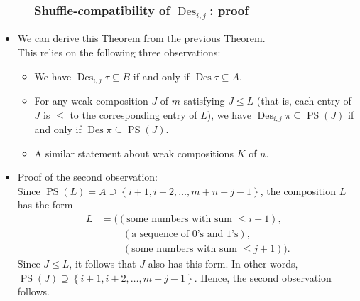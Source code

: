 \documentclass{beamer}
\newcommand{\Des}{\operatorname{Des}}
\newcommand{\PS}{\operatorname{PS}}
\newcommand{\fti}[1]{\frametitle{\ \ \ \ \ #1}}
\newcommand{\set}[1]{\left\{ #1 \right\}}
\newcommand{\tup}[1]{\left( #1 \right)}
\theoremstyle{plain}
\begin{document}
\begin{frame}
\fti{Shuffle-compatibility of $\Des_{i,j}$: proof}

\begin{itemize}

\item We can derive this Theorem from the previous Theorem. \\
      This relies on the following three observations:
      \begin{itemize}
      \item We have $\Des_{i, j} \tau \subseteq B$ if and only if
            $\Des \tau \subseteq A$.
      \item For any weak composition $J$ of $m$ satisfying
            $J \leq L$ (that is, each entry of $J$ is $\leq$
            to the corresponding entry of $L$),
            we have
            $\Des_{i, j} \pi \subseteq \PS \tup{J}$
            if and only if
            $\Des \pi \subseteq \PS \tup{J}$.
      \item A similar statement about weak compositions $K$ of $n$.
      \end{itemize}
      
\pause
{}
\pause
\item Proof of the second observation: \\
      Since $\PS \tup{L} = A \supseteq \set{i+1, i+2, \ldots, m+n-j-1}$,
      the composition $L$ has the form
      \begin{align*}
      L &= \big( \tup{\text{some numbers with sum } \leq i+1} , \\
                &\qquad \ \tup{\text{a sequence of }0\text{'s and }1\text{'s}}, \\
                &\qquad \ \tup{\text{some numbers with sum }\leq j+1 } \big) .
      \end{align*}
      Since $J \leq L$, it follows that $J$ also has this form.
      In other words,
      $\PS \tup{J} \supseteq \set{i+1, i+2, \ldots, m-j-1}$.
      Hence, the second observation follows.

\end{itemize}

\vspace{10cm}

\end{frame}

\end{document}
